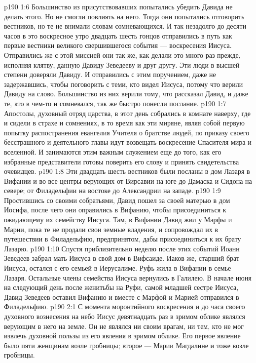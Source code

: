 \vs p190 1:6 \pc Большинство из присутствовавших попытались убедить Давида не делать этого. Но не смогли повлиять на него. Тогда они попытались отговорить вестников, но те не внимали словам сомневающихся. И так незадолго до десяти часов в это воскресное утро двадцать шесть гонцов отправились в путь как первые вестники великого свершившегося события --- воскресения Иисуса. Отправились же с этой миссией они так же, как делали это много раз прежде, исполняя клятву, данную Давиду Зеведееву и друг другу. Эти люди в высшей степени доверяли Давиду. И отправились с этим поручением, даже не задержавшись, чтобы поговорить с теми, кто видел Иисуса, потому что верили Давиду на слово. Большинство из них верили тому, что рассказал Давид, и даже те, кто в чем\hyp{}то и сомневался, так же быстро понесли послание.
\vs p190 1:7 \pc Апостолы, духовный отряд царства, в этот день собрались в комнате наверху, где и сидели в страхе и сомнениях, в то время как эти миряне, являя собой первую попытку распостранения евангелия Учителя о братстве людей, по приказу своего бесстрашного и деятельного главы идут возвещать воскресение Спасителя мира и вселенной. И занимаются этим важным служением еще до того, как его избранные представители готовы поверить его слову и принять свидетельства очевидцев.
\vs p190 1:8 \pc Эти двадцать шесть вестников были посланы в дом Лазаря в Вифании и во все центры верующих от Вирсавии на юге до Дамаска и Сидона на севере; от Филадельфии на востоке до Александрии на западе.
\vs p190 1:9 Простившись со своими собратьями, Давид пошел за своей матерью в дом Иосифа, после чего они оправились в Вифанию, чтобы присоединиться к ожидающему их семейству Иисуса. Там, в Вифании Давид жил у Марфы и Марии, пока те не продали свои земные владения, и сопровождал их в путешествии в Филадельфию, предпринятом, дабы присоединиться к их брату Лазарю.
\vs p190 1:10 Спустя приблизительно неделю после этих событий Иоанн Зеведеев забрал мать Иисуса в свой дом в Вифсаиде. Иаков же, старший брат Иисуса, остался с его семьей в Иерусалиме. Руфь жила в Вифании в семье Лазаря. Остальные члены семейства Иисуса вернулись в Галилею. В начале июня на следующий день после женитьбы на Руфи, самой младшей сестре Иисуса, Давид Зеведеев оставил Вифанию и вместе с Марфой и Марией отправился в Филадельфию.
\vs p190 2:1 С момента моронтийного воскресения и до часа своего духовного вознесения на небо Иисус девятнадцать раз в зримом облике являлся верующим в него на земле. Он не являлся ни своим врагам, ни тем, кто не мог извлечь духовной пользы из его явления в зримом облике. Его первое явление было пяти женщинам возле гробницы; второе --- Марии Магдалине и тоже возле гробницы.
